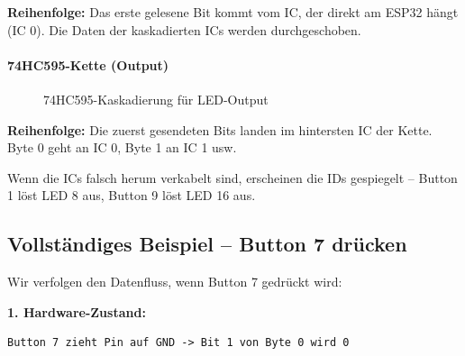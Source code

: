 \textbf{Reihenfolge:} Das erste gelesene Bit kommt vom IC, der direkt am ESP32 hängt (IC 0). Die Daten der kaskadierten ICs werden \glqq durchgeschoben\grqq.

\paragraph{74HC595-Kette (Output)}

\begin{figure}[htbp]
\centering
{}
\caption{74HC595-Kaskadierung für LED-Output}
\label{fig:hc595-kette}
\end{figure}

\textbf{Reihenfolge:} Die zuerst gesendeten Bits landen im hintersten IC der Kette. Byte 0 geht an IC 0, Byte 1 an IC 1 usw.

\begin{warnbox}
Wenn die ICs falsch herum verkabelt sind, erscheinen die IDs \glqq gespiegelt\grqq{} – Button 1 löst LED 8 aus, Button 9 löst LED 16 aus.
\end{warnbox}

\subsection{Vollständiges Beispiel – Button 7 drücken}

Wir verfolgen den Datenfluss, wenn Button 7 gedrückt wird:

\textbf{1. Hardware-Zustand:}
\begin{lstlisting}[style=wrap,numbers=none]
Button 7 zieht Pin auf GND -> Bit 1 von Byte 0 wird 0
\end{lstlisting}

